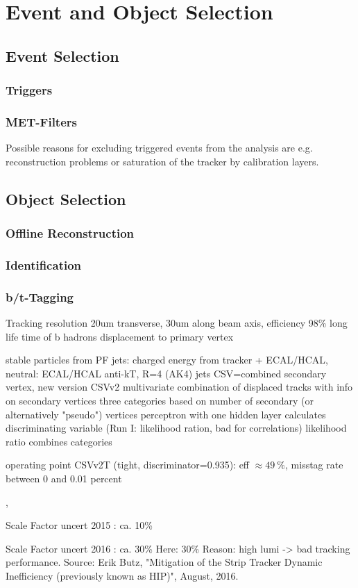 
\chapter{Event and Object Selection}
\label{chap:selection}

\section{Event Selection}
\subsection{Triggers}
\subsection{MET-Filters}
Possible reasons for excluding triggered events from the analysis are e.g.
reconstruction problems or saturation of the tracker by calibration layers.


\section{Object Selection}
\subsection{Offline Reconstruction}
\subsection{Identification}
\subsection{b/t-Tagging}
\label{sec:b_tagging}

Tracking resolution 20um transverse, 30um along beam axis, efficiency 98\%
long life time of b hadrons
displacement to primary vertex

stable particles from PF
jets: charged energy from tracker + ECAL/HCAL, neutral: ECAL/HCAL
anti-kT, R=4 (AK4) jets
CSV=combined secondary vertex, new version CSVv2
multivariate combination of displaced tracks with info on secondary vertices
three categories based on number of secondary (or alternatively "pseudo")
vertices
perceptron with one hidden layer calculates discriminating variable (Run I: likelihood ration, bad for correlations)
likelihood ratio combines categories

operating point CSVv2T (tight, discriminator=0.935): eff $\approx \SI{49}{\percent}$, misstag rate between 0 and 0.01 percent


\cite{CMS:CMS-PAS-BTV-15-001},

Scale Factor uncert 2015 \cite[Fig. 34]{CMS:CMS-AN-2016-036}: ca. 10\%

Scale Factor uncert 2016 \cite[Fig. 73]{CMS:CMS-AN-2017-018}: ca. 30\%
Here: 30\%
Reason: high lumi -> bad tracking performance. Source: Erik Butz, "Mitigation of the Strip Tracker Dynamic Inefficiency (previously known as HIP)", August, 2016.

